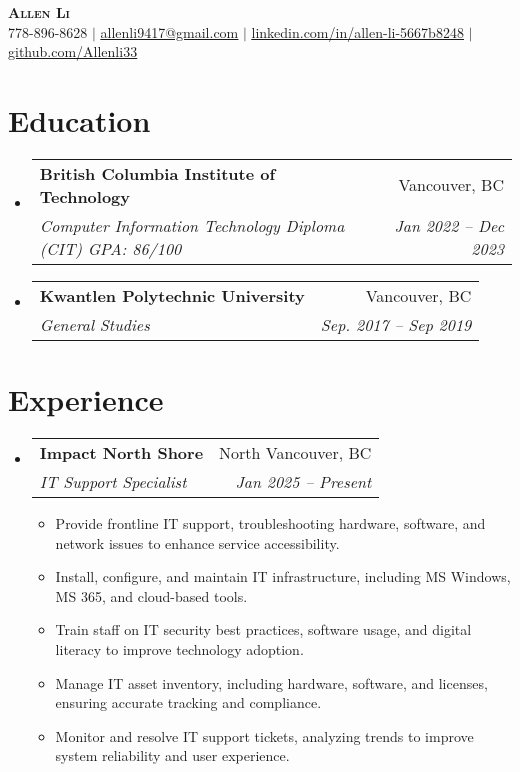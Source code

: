 \documentclass[letterpaper,11pt]{article}
\makeatletter
\newcommand{\resumeItem}[1]{
  \item\small{
    {#1 \vspace{-2pt}}
  }
}
\newcommand{\resumeSubheading}[4]{
  \vspace{-2pt}\item
    \begin{tabular*}{0.97\textwidth}[t]{l@{\extracolsep{\fill}}r}
      \textbf{#1} & #2 \\
      \textit{\small#3} & \textit{\small #4} \\
    \end{tabular*}\vspace{-7pt}
}
\newcommand{\resumeSubHeadingListStart}{\begin{itemize}[leftmargin=0.15in, label={}]}
\newcommand{\resumeSubHeadingListEnd}{\end{itemize}}
\newcommand{\resumeItemListStart}{\begin{itemize}}
\newcommand{\resumeItemListEnd}{\end{itemize}\vspace{-5pt}}
\makeatother
\begin{document}
\begin{center}
    \textbf{\Huge \scshape Allen Li} \\ \vspace{1pt}
    \small 778-896-8628 $|$ \href{mailto:allenli9417@gmail.com}{\underline{allenli9417@gmail.com}} $|$ 
    \href{https://linkedin.com/in/allen-li-5667b8248}{\underline{linkedin.com/in/allen-li-5667b8248}} $|$
    \href{https://github.com/Allenli33}{\underline{github.com/Allenli33}}
\end{center}

\section{Education}
  \resumeSubHeadingListStart
    \resumeSubheading
      {British Columbia Institute of Technology}{Vancouver, BC}
      {Computer Information Technology Diploma (CIT) GPA: 86/100}{Jan 2022 -- Dec 2023}
    \resumeSubheading
      {Kwantlen Polytechnic University}{Vancouver, BC}
      {General Studies}{Sep. 2017 -- Sep 2019}
  \resumeSubHeadingListEnd

\section{Experience}
  \resumeSubHeadingListStart

    \resumeSubheading
      {Impact North Shore}{North Vancouver, BC}
      {IT Support Specialist}{Jan 2025 – Present}
      \resumeItemListStart
      \resumeItem{Provide frontline IT support, troubleshooting hardware, software, and network issues to enhance service accessibility.}
      \resumeItem{Install, configure, and maintain IT infrastructure, including MS Windows, MS 365, and cloud-based tools.}
      \resumeItem{Train staff on IT security best practices, software usage, and digital literacy to improve technology adoption.}
      \resumeItem{Manage IT asset inventory, including hardware, software, and licenses, ensuring accurate tracking and compliance.}
      \resumeItem{Monitor and resolve IT support tickets, analyzing trends to improve system reliability and user experience.}
    \resumeItemListEnd
      

  \resumeSubHeadingListEnd    %

\end{document}
